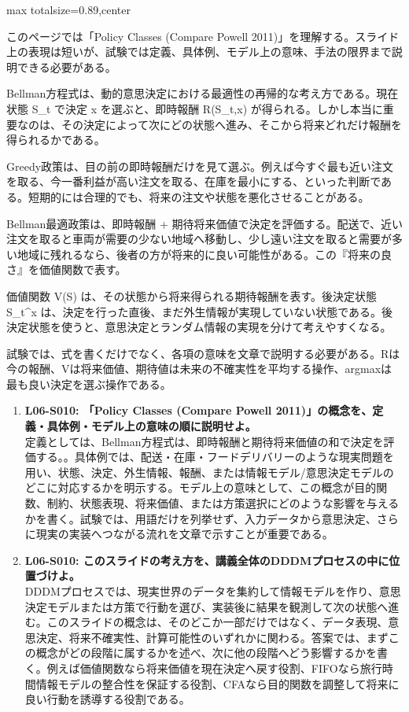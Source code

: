 \begin{minipage}[t]{0.58\textwidth}
\begin{adjustbox}{max totalsize={\textwidth}{0.89\textheight},center}
\begin{minipage}{\textwidth}\scriptsize
{}このページでは「Policy Classes (Compare Powell 2011)」を理解する。スライド上の表現は短いが、試験では定義、具体例、モデル上の意味、手法の限界まで説明できる必要がある。\par
Bellman方程式は、動的意思決定における最適性の再帰的な考え方である。現在状態 S\_t で決定 x を選ぶと、即時報酬 R(S\_t,x) が得られる。しかし本当に重要なのは、その決定によって次にどの状態へ進み、そこから将来どれだけ報酬を得られるかである。\par
Greedy政策は、目の前の即時報酬だけを見て選ぶ。例えば今すぐ最も近い注文を取る、今一番利益が高い注文を取る、在庫を最小にする、といった判断である。短期的には合理的でも、将来の注文や状態を悪化させることがある。\par
Bellman最適政策は、即時報酬 + 期待将来価値で決定を評価する。配送で、近い注文を取ると車両が需要の少ない地域へ移動し、少し遠い注文を取ると需要が多い地域に残れるなら、後者の方が将来的に良い可能性がある。この『将来の良さ』を価値関数で表す。\par
価値関数 V(S) は、その状態から将来得られる期待報酬を表す。後決定状態 S\_t\textasciicircum{}x は、決定を行った直後、まだ外生情報が実現していない状態である。後決定状態を使うと、意思決定とランダム情報の実現を分けて考えやすくなる。\par
試験では、式を書くだけでなく、各項の意味を文章で説明する必要がある。Rは今の報酬、Vは将来価値、期待値は未来の不確実性を平均する操作、argmaxは最も良い決定を選ぶ操作である。\par{}\begin{enumerate}\item \textbf{L06-S010: 「Policy Classes (Compare Powell 2011)」の概念を、定義・具体例・モデル上の意味の順に説明せよ。}\\定義としては、Bellman方程式は、即時報酬と期待将来価値の和で決定を評価する。。具体例では、配送・在庫・フードデリバリーのような現実問題を用い、状態、決定、外生情報、報酬、または情報モデル/意思決定モデルのどこに対応するかを明示する。モデル上の意味として、この概念が目的関数、制約、状態表現、将来価値、または方策選択にどのような影響を与えるかを書く。試験では、用語だけを列挙せず、入力データから意思決定、さらに現実の実装へつながる流れを文章で示すことが重要である。\item \textbf{L06-S010: このスライドの考え方を、講義全体のDDDMプロセスの中に位置づけよ。}\\DDDMプロセスでは、現実世界のデータを集約して情報モデルを作り、意思決定モデルまたは方策で行動を選び、実装後に結果を観測して次の状態へ進む。このスライドの概念は、そのどこか一部だけではなく、データ表現、意思決定、将来不確実性、計算可能性のいずれかに関わる。答案では、まずこの概念がどの段階に属するかを述べ、次に他の段階へどう影響するかを書く。例えば価値関数なら将来価値を現在決定へ戻す役割、FIFOなら旅行時間情報モデルの整合性を保証する役割、CFAなら目的関数を調整して将来に良い行動を誘導する役割である。\end{enumerate}

\end{minipage}
\end{adjustbox}
\end{minipage}
